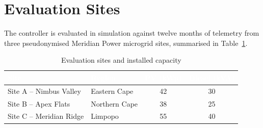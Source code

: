 \section{Evaluation Sites}
The controller is evaluated in simulation against twelve months of telemetry from three
pseudonymised Meridian Power microgrid sites, summarised in Table~\ref{tab:sites}.

\begin{table}[h]
\centering
\caption{Evaluation sites and installed capacity}
\label{tab:sites}
\begin{tabularx}{\textwidth}{@{}l X c c@{}}
\toprule
\rowcolor{uctblue}
\textcolor{white}{\textbf{Site}} & \textcolor{white}{\textbf{Region}} &
\textcolor{white}{\textbf{PV (kWp)}} & \textcolor{white}{\textbf{Diesel (kVA)}} \\
\midrule
Site A -- Nimbus Valley & Eastern Cape & 42 & 30 \\
Site B -- Apex Flats & Northern Cape & 38 & 25 \\
Site C -- Meridian Ridge & Limpopo & 55 & 40 \\
\bottomrule
\end{tabularx}
\end{table}
